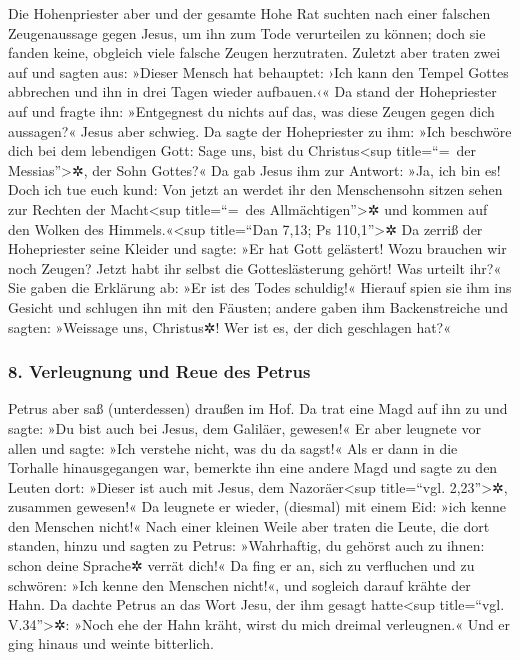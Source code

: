  Die Hohenpriester aber und der gesamte Hohe Rat suchten
nach einer falschen Zeugenaussage gegen Jesus, um ihn zum Tode
verurteilen zu können;  doch sie fanden keine, obgleich
viele falsche Zeugen herzutraten. Zuletzt aber traten zwei auf
 und sagten aus: »Dieser Mensch hat behauptet: ›Ich kann
den Tempel Gottes abbrechen und ihn in drei Tagen wieder aufbauen.‹«
 Da stand der Hohepriester auf und fragte ihn:
»Entgegnest du nichts auf das, was diese Zeugen gegen dich aussagen?«
Jesus aber schwieg.  Da sagte der Hohepriester zu ihm:
»Ich beschwöre dich bei dem lebendigen Gott: Sage uns, bist du
Christus\textless sup title=``=~der Messias''\textgreater✲, der Sohn
Gottes?«  Da gab Jesus ihm zur Antwort: »Ja, ich bin es!
Doch ich tue euch kund: Von jetzt an werdet ihr den Menschensohn sitzen
sehen zur Rechten der Macht\textless sup title=``=~des
Allmächtigen''\textgreater✲ und kommen auf den Wolken des
Himmels.«\textless sup title=``Dan 7,13; Ps 110,1''\textgreater✲
 Da zerriß der Hohepriester seine Kleider und sagte: »Er
hat Gott gelästert! Wozu brauchen wir noch Zeugen? Jetzt habt ihr selbst
die Gotteslästerung gehört! Was urteilt ihr?«  Sie gaben
die Erklärung ab: »Er ist des Todes schuldig!«  Hierauf
spien sie ihm ins Gesicht und schlugen ihn mit den Fäusten; andere gaben
ihm Backenstreiche  und sagten: »Weissage uns, Christus✲!
Wer ist es, der dich geschlagen hat?«

\hypertarget{verleugnung-und-reue-des-petrus}{%
\subsubsection{8. Verleugnung und Reue des
Petrus}\label{verleugnung-und-reue-des-petrus}}

 Petrus aber saß (unterdessen) draußen im Hof. Da trat
eine Magd auf ihn zu und sagte: »Du bist auch bei Jesus, dem Galiläer,
gewesen!«  Er aber leugnete vor allen und sagte: »Ich
verstehe nicht, was du da sagst!«  Als er dann in die
Torhalle hinausgegangen war, bemerkte ihn eine andere Magd und sagte zu
den Leuten dort: »Dieser ist auch mit Jesus, dem Nazoräer\textless sup
title=``vgl. 2,23''\textgreater✲, zusammen gewesen!«  Da
leugnete er wieder, (diesmal) mit einem Eid: »ich kenne den Menschen
nicht!«  Nach einer kleinen Weile aber traten die Leute,
die dort standen, hinzu und sagten zu Petrus: »Wahrhaftig, du gehörst
auch zu ihnen: schon deine Sprache✲ verrät dich!«  Da
fing er an, sich zu verfluchen und zu schwören: »Ich kenne den Menschen
nicht!«, und sogleich darauf krähte der Hahn.  Da dachte
Petrus an das Wort Jesu, der ihm gesagt hatte\textless sup title=``vgl.
V.34''\textgreater✲: »Noch ehe der Hahn kräht, wirst du mich dreimal
verleugnen.« Und er ging hinaus und weinte bitterlich.

